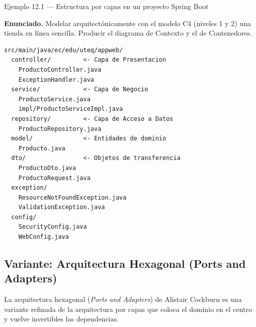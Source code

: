 \documentclass[11pt,a4paper,openany]{book}
\begin{document}
\begin{cajaejemplo}{Ejemplo 12.1 --- Estructura por capas en un proyecto Spring Boot}

\textbf{Enunciado.} Modelar arquitectónicamente con el modelo C4 (niveles 1 y 2) una tienda en línea sencilla. Producir el diagrama de Contexto y el de Contenedores.

\begin{lstlisting}[style=shell,numbers=none,caption={Ejemplo de Shell},label=lst:12.1]
src/main/java/ec/edu/uteq/appweb/
  controller/         <- Capa de Presentacion
    ProductoController.java
    ExceptionHandler.java
  service/            <- Capa de Negocio
    ProductoService.java
    impl/ProductoServiceImpl.java
  repository/         <- Capa de Acceso a Datos
    ProductoRepository.java
  model/              <- Entidades de dominio
    Producto.java
  dto/                <- Objetos de transferencia
    ProductoDto.java
    ProductoRequest.java
  exception/
    ResourceNotFoundException.java
    ValidationException.java
  config/
    SecurityConfig.java
    WebConfig.java
\end{lstlisting}
\end{cajaejemplo}

\subsection{Variante: Arquitectura Hexagonal (Ports and Adapters)}

La arquitectura hexagonal (\emph{Ports and Adapters}) de
Alistair Cockburn es una variante refinada de la arquitectura por
capas que coloca el dominio en el centro y vuelve invertibles las
dependencias.
\end{document}
